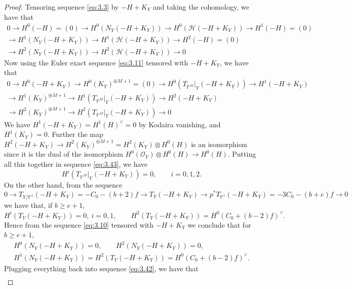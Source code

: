 \documentclass[11pt,twoside]{amsart}
\theoremstyle{plain}
\theoremstyle{definition}
\newcommand{\PP}{\mathbb{P}}
\newcommand{\PM}{\mathbb{P}^M}
\newcommand{\OO}{\mathcal{O}}
\newcommand{\NY}{N_{Y}}
\newcommand{\Hc}{\mathcal{H}}
\newcommand{\TP}{T_{\PM}|_Y}
\begin{document}
\begin{proof}
Tensoring sequence \eqref{eq:3.3} by $-H+K_Y$ and taking the cohomology, we have that
\begin{multline}\label{eq:3.42}
0\to H^0(-H)=(0)\to H^0(\NY(-H+K_Y))\to H^0(\Hc(-H+K_Y))\to H^1(-H)=(0)\\
\to H^1(\NY(-H+K_Y))\to H^1(\Hc(-H+K_Y))\to H^2(-H)=(0)\\
\to H^2(\NY(-H+K_Y))\to H^2(\Hc(-H+K_Y))\to 0
\end{multline}
Now using the Euler exact sequence \eqref{eq:3.11} tensored with $-H+K_Y$, we have that
\begin{multline}\label{eq:3.43}
0\to H^0(-H+K_Y)\to H^0(K_Y)^{\oplus M+1}=(0)\to H^0(\TP(-H+K_Y))\to H^1(-H+K_Y)\\
\to H^1(K_Y)^{\oplus M+1}\to H^1(\TP(-H+K_Y))\to H^2(-H+K_Y)\\
\to H^2(K_Y)^{\oplus M+1}\to H^2(\TP(-H+K_Y))\to 0
\end{multline}
We have $H^1(-H+K_Y)=H^1(H)^{\vee}=0$ by Kodaira vanishing, and $H^1(K_Y)=0$. Further the map $H^2(-H+K_Y)\to H^2(K_Y)^{\oplus M+1}=H^2(K_Y)\otimes H^0(H)$ is an isomorphism since it is the dual of the isomorphism $H^0(\OO_Y)\otimes H^0(H)\to H^0(H)$. Putting all this together in sequence \eqref{eq:3.43}, we have
\begin{equation}\label{eq:3.44}
H^i(\TP(-H+K_Y))=0,\qquad i=0,1,2 .
\end{equation}
On the other hand, from the sequence
\begin{equation}\label{eq:3.45}
0\to T_{Y/\PP^1}(-H+K_Y)=-C_0-(b+2)f\to T_Y(-H+K_Y)\to p^*T_{\PP^1}(-H+K_Y)=-3C_0-(b+e)f\to 0
\end{equation}
we have that, if $b\ge e+1$,
\begin{equation}\label{eq:3.46}
H^i(T_Y(-H+K_Y))=0,\ i=0,1,\qquad H^2(T_Y(-H+K_Y))=H^0(C_0+(b-2)f)^{\vee}.
\end{equation}
Hence from the sequence \eqref{eq:3.10} tensored with $-H+K_Y$ we conclude that for $b\ge e+1$,
\begin{equation}\label{eq:3.47}
\begin{gathered}
H^0(\NY(-H+K_Y))=0,\qquad H^2(\NY(-H+K_Y))=0,\\
H^1(\NY(-H+K_Y))=H^2(T_Y(-H+K_Y))=H^0(C_0+(b-2)f)^{\vee}.
\end{gathered}
\end{equation}
Plugging everything back into sequence \eqref{eq:3.42}, we have that
\begin{equation}\label{eq:3.48}
\begin{gathered}

\end{gathered}
\end{equation}
\end{proof}
\end{document}
